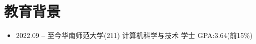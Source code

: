\section{教育背景}
\begin{normalsize}
  \begin{itemize}[parsep=0.5ex]
    \item {2022.09 -- 至今}\hspace{0.8cm}华南师范大学(211)  \hspace{0.8cm} 计算机科学与技术 \hspace{0.8cm} 学士 \hspace{0.8cm} GPA:3.64(前15\%)
  \end{itemize}
\end{normalsize}